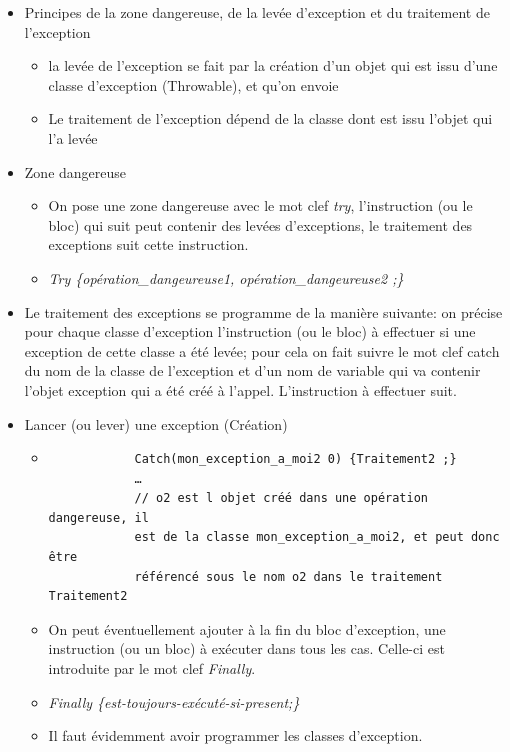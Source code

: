 \documentclass{article}
\begin{document}
\begin{itemize}
	\item Principes de la zone dangereuse, de la levée d'exception et du traitement de
		l’exception
	\begin{itemize}
		\item la levée de l'exception se fait par la création d’un objet qui est issu d’une
			classe d’exception (Throwable), et qu’on envoie
		\item Le traitement de l’exception dépend de la classe dont est issu l’objet qui l’a
			levée
	\end{itemize}
	\item Zone dangereuse
	\begin{itemize}
		\item On pose une zone dangereuse avec le mot clef \emph{try}, l'instruction (ou le
			bloc) qui suit peut contenir des levées d'exceptions,
			le traitement des exceptions suit cette instruction.	
		\item \emph{Try \{opération\_dangeureuse1, opération\_dangeureuse2 ;\}}
	\end{itemize}
	\item Le traitement des exceptions se programme de la manière suivante:
		on précise pour chaque classe d'exception l'instruction (ou le bloc) à
		effectuer si une exception de cette classe a été levée; pour cela on
		fait suivre le mot clef catch du nom de la classe de l'exception et
		d'un nom de variable qui va contenir l'objet exception qui a été créé
		à l'appel. L'instruction à effectuer suit.
	\item  Lancer (ou lever) une exception (Création)
	\begin{itemize}
		\item 
		\begin{verbatim}
			Catch(mon_exception_a_moi2 0) {Traitement2 ;}
			…
			// o2 est l objet créé dans une opération dangereuse, il
			est de la classe mon_exception_a_moi2, et peut donc être
			référencé sous le nom o2 dans le traitement Traitement2
		\end{verbatim}
		\item On peut éventuellement ajouter à la fin du bloc d'exception, une instruction
			(ou un bloc) à exécuter dans tous les cas. Celle-ci est introduite par le mot clef
			\emph{Finally}.
		\item \emph{Finally \{est-toujours-exécuté-si-present;\}}
		\item Il faut évidemment avoir programmer les classes d'exception.
	\end{itemize}

\end{itemize}
\end{document}
